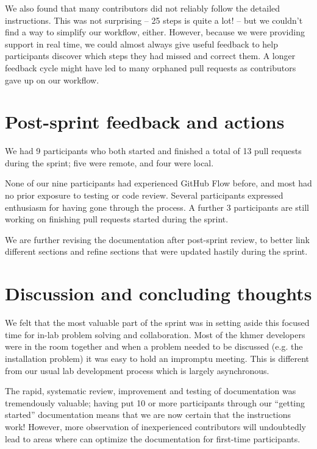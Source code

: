 \documentclass[11pt]{article}
\begin{document}
We also found that many contributors did not reliably follow the
detailed instructions.  This was not surprising -- 25 steps is quite a
lot! -- but we couldn't find a way to simplify our workflow, either.
However, because we were providing support in real time, we could
almost always give useful feedback to help participants discover which
steps they had missed and correct them.  A longer feedback cycle might
have led to many orphaned pull requests as contributors gave up on our
workflow.

\section{Post-sprint feedback and actions}

We had 9 participants who both started and finished a total of 13 pull
requests during the sprint; five were remote, and four were
local.

None of our nine participants had experienced GitHub Flow before, and
most had no prior exposure to testing or code review.  Several
participants expressed enthusiasm for having gone through the process.
A further 3 participants are still working on finishing pull requests
started during the sprint.

We are further revising the documentation after post-sprint review, to
better link different sections and refine sections that were updated
hastily during the sprint.

\section{Discussion and concluding thoughts}

We felt that the most valuable part of the sprint was in setting aside
this focused time for in-lab problem solving and collaboration.  Most of
the khmer developers were in the room together and when a problem
needed to be discussed (e.g. the installation problem) it was easy to
hold an impromptu meeting.  This is different from our usual lab
development process which is largely asynchronous.

The rapid, systematic review, improvement and testing of documentation
was tremendously valuable; having put 10 or more participants through
our ``getting started'' documentation means that we are now certain
that the instructions work!  However, more observation of
inexperienced contributors will undoubtedly lead to areas where can
optimize the documentation for first-time participants.
\end{document}
